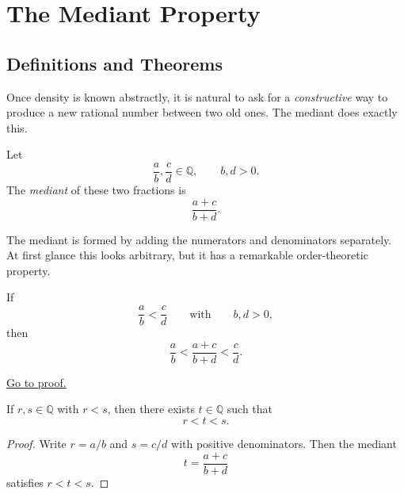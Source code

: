 
\section{The Mediant Property}
\label{sec:mediant}

\subsection{Definitions and Theorems}

Once density is known abstractly, it is natural to ask for a \emph{constructive} way to produce a
new rational number between two old ones.  The mediant does exactly this.

\begin{definition}[Mediant]
\label{def:mediant}
Let
\[
\frac{a}{b},\frac{c}{d}\in\mathbb{Q},
\qquad b,d>0.
\]
The \emph{mediant} of these two fractions is
\[
\frac{a+c}{b+d}.
\]
\end{definition}

\begin{remark}
The mediant is formed by adding the numerators and denominators separately.  At first glance this
looks arbitrary, but it has a remarkable order-theoretic property.
\end{remark}

\begin{theorem}
\label{thm:mediant-inequality}
If
\[
\frac{a}{b}<\frac{c}{d}
\qquad\text{with}\qquad b,d>0,
\]
then
\[
\frac{a}{b}<\frac{a+c}{b+d}<\frac{c}{d}.
\]
\end{theorem}

\begin{remark*}[Proof]
\hyperref[prf:mediant-inequality]{Go to proof.}
\end{remark*}

\begin{corollary}
\label{cor:q-dense-in-q}
If $r,s\in\mathbb{Q}$ with $r<s$, then there exists $t\in\mathbb{Q}$ such that
\[
r<t<s.
\]
\end{corollary}

\begin{proof}
Write $r=a/b$ and $s=c/d$ with positive denominators.  Then the mediant
\[
t=\frac{a+c}{b+d}
\]
satisfies $r<t<s$.
\end{proof}

